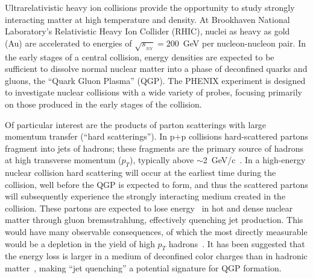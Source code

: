 \begin{multicols}{2}   %
\narrowtext            %
%
%
%
%
%
%
%
%

Ultrarelativistic heavy ion collisions provide the opportunity
to study strongly interacting matter at high temperature and density.  
At Brookhaven National Laboratory's Relativistic Heavy Ion Collider (RHIC), 
nuclei as heavy as gold (Au) are accelerated to energies of 
$\sqrt{s_{_{NN}}}=200$~GeV per 
nucleon-nucleon pair.  In the early stages of a central collision, 
energy densities are expected to be sufficient to  
dissolve normal nuclear matter into a phase of deconfined 
quarks and gluons, the ``Quark Gluon Plasma'' (QGP).
The PHENIX experiment is designed to investigate nuclear collisions with
a wide variety of probes, focusing primarily on those produced in 
the early stages of the collision. 

Of particular interest are the products of parton scatterings with
large momentum transfer (``hard scatterings''). 
In p+p collisions hard-scattered partons fragment into jets 
of hadrons; these fragments are the primary source of hadrons at 
high transverse momentum ($p_T$), typically 
above $\sim$2~GeV/c~\cite{textbook}. 
In a high-energy nuclear collision 
hard scattering will occur at the earliest time during the collision, 
well before the QGP is expected to form, and thus the scattered partons 
will subsequently experience the strongly interacting medium created in 
the collision.
These partons are expected to lose energy~\cite{quenching_theory} 
in hot and dense nuclear matter through gluon 
bremsstrahlung, effectively quenching jet production. This would have 
many observable consequences, of which the most directly measurable 
would be a depletion in the yield of high $p_T$ hadrons~\cite{quench_effect}. 
It has been suggested that the energy loss is larger in a medium of deconfined 
color charges than in hadronic matter~\cite{Baier}, making ``jet quenching'' a 
potential signature for QGP formation.   


\end{multicols}
